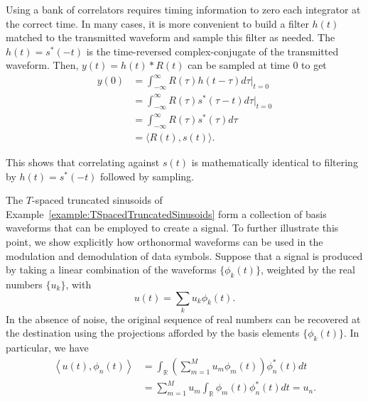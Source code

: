 Using a bank of correlators requires timing information to zero each integrator at the correct time.
In many cases, it is more convenient to build a filter $h(t)$ matched to the transmitted waveform and sample this filter as needed.
The  $h(t) = s^* (-t)$ is the time-reversed complex-conjugate of the transmitted waveform.
Then, $y(t) = h(t) * R(t)$ can be sampled at time $0$ to get
\begin{align*}
y(0)
&= \int_{-\infty}^{\infty} R(\tau) h(t-\tau) d \tau \bigg|_{t = 0} \\
&= \int_{-\infty}^{\infty} R(\tau) s^* (\tau-t) d \tau \bigg|_{t = 0} \\
&= \int_{-\infty}^{\infty} R(\tau) s^* (\tau) d \tau \\
&= \langle R(t) , s(t) \rangle.
\end{align*}

This shows that correlating against $s(t)$ is mathematically identical to filtering by $h(t) = s^* (-t)$ followed by sampling.

\iffalse
The $T$-spaced truncated sinusoids of Example~\ref{example:TSpacedTruncatedSinusoids} form a collection of basis waveforms that can be employed to create a signal.
To further illustrate this point, we show explicitly how orthonormal waveforms can be used in the modulation and demodulation of data symbols.
Suppose that a signal is produced by taking a linear combination of the waveforms $\{ \phi_k(t) \}$, weighted by the real numbers $\{ u_k \}$, with
\begin{equation*}
u(t) = \sum_{k} u_k \phi_k(t) .
\end{equation*}
In the absence of noise, the original sequence of real numbers can be recovered at the destination using the projections afforded by the basis elements $\{ \phi_k (t) \}$.
In particular, we have
\begin{equation*}
\begin{split}
\left\langle u(t), \phi_n(t) \right\rangle
&= \int_{\mathbb{R}}
\left( \sum_{m=1}^M u_m \phi_m(t) \right) \phi_n^*(t) dt \\
&= \sum_{m=1}^M u_m \int_{\mathbb{R}}
\phi_m(t) \phi_n^*(t) dt
= u_n .
\end{split}
\end{equation*}

